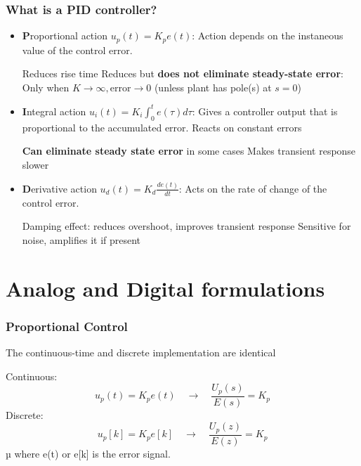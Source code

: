 \begin{frame}
	\frametitle{What is a PID controller?}
	\small{
	\begin{itemize}
		\item \textbf{P}roportional action $u_p(t) = K_p e(t)$: Action depends on the instaneous value of the control error. 
			\begin{itemize}
				\pro Reduces rise time
				\con Reduces but \textbf{does not eliminate steady-state error}: Only when $K \rightarrow \infty , \text{error} \rightarrow 0$
				 (unless plant has pole(s) at $s=0$)
			\end{itemize}
		\item \textbf{I}ntegral action $u_i(t) =K_i\int_0^t e(\tau)d\tau$: Gives a controller output that is proportional to the accumulated error. Reacts on constant errors
			\begin{itemize}
				\pro  \textbf{Can eliminate steady state error} in some cases
				\con Makes transient response slower 
			\end{itemize}
	
		\item \textbf{D}erivative action $u_d(t) = K_d \frac{de(t)}{dt}$: Acts on the rate of change of the control error. 
			\begin{itemize}
				\pro Damping effect: reduces overshoot, improves transient response
				\con Sensitive for noise, amplifies it if present
			\end{itemize}
	\end{itemize}}
\end{frame}

\section{Analog and Digital formulations}

\begin{frame}
	\frametitle{Proportional Control}
	The continuous-time and discrete implementation are identical
	
	Continuous:
	\begin{equation*}
		u_p(t) = K_p e(t) \quad \rightarrow \quad \frac{U_p(s)}{E(s)} = K_p 
	\end{equation*}
	Discrete:
	\begin{equation*}
		u_p[k] = K_p e[k] \quad \rightarrow \quad \frac{U_p(z)}{E(z)} = K_p 
	\end{equation*}µ
	where e(t) or e[k] is the error signal.
\end{frame}

